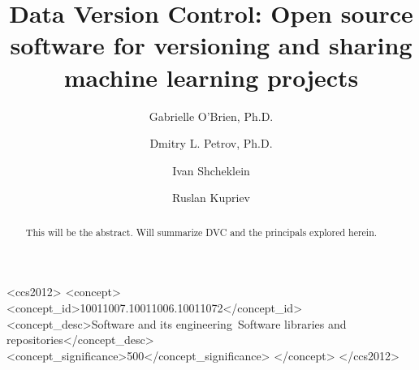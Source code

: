 \documentclass[10pt,sigconf, authordraft]{acmart}
\begin{document}
\title{Data Version Control: Open source software for versioning and sharing machine learning projects}

\author{Gabrielle O'Brien, Ph.D.}

\author{Dmitry L. Petrov, Ph.D.}

\author{Ivan Shcheklein}

\author{Ruslan Kupriev}



\renewcommand{\shortauthors}{O'Brien et al.}

\begin{abstract}
 This will be the abstract. Will summarize DVC and the principals
 explored herein.
\end{abstract}

\begin{CCSXML}
<ccs2012>
<concept>
<concept_id>10011007.10011006.10011072</concept_id>
<concept_desc>Software and its engineering~Software libraries and repositories</concept_desc>
<concept_significance>500</concept_significance>
</concept>
</ccs2012>
\end{CCSXML}

\end{document}
